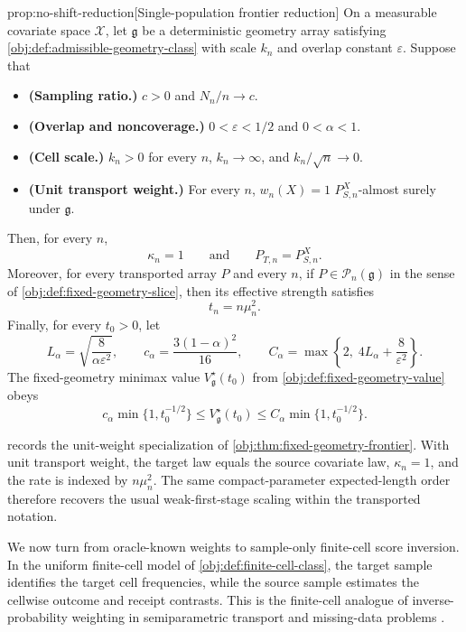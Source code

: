\begin{theoremv}{prop:no-shift-reduction}[Single-population frontier reduction]
On a measurable covariate space \(\mathcal X\), let \(\mathfrak g\) be a deterministic geometry array satisfying \cref{obj:def:admissible-geometry-class} with scale \(k_n\) and overlap constant \(\varepsilon\). Suppose that
\begin{itemize}
\item \textbf{(Sampling ratio.)} \(c>0\) and \(N_n/n \to c\).
\item \textbf{(Overlap and noncoverage.)} \(0<\varepsilon<1/2\) and \(0<\alpha<1\).
\item \textbf{(Cell scale.)} \(k_n>0\) for every \(n\), \(k_n\to\infty\), and \(k_n/\sqrt n\to 0\).
\item \textbf{(Unit transport weight.)} For every \(n\), \(w_n(X)=1\) \(P_{S,n}^X\)-almost surely under \(\mathfrak g\).
\end{itemize}
Then, for every \(n\),
\[
\kappa_n=1
\qquad\text{and}\qquad
P_{T,n}=P_{S,n}^X .
\]
Moreover, for every transported array \(P\) and every \(n\), if \(P\in\mathcal P_n(\mathfrak g)\) in the sense of \cref{obj:def:fixed-geometry-slice}, then its effective strength satisfies
\[
t_n
=
n\mu_n^2 .
\]
Finally, for every \(t_0>0\), let
\[
L_\alpha=\sqrt{\frac{8}{\alpha\varepsilon^2}},
\qquad
c_\alpha=\frac{3(1-\alpha)^2}{16},
\qquad
C_\alpha=\max\left\{2,\;4L_\alpha+\frac{8}{\varepsilon^2}\right\}.
\]
The fixed-geometry minimax value \(V_{\mathfrak g}^\star(t_0)\) from \cref{obj:def:fixed-geometry-value} obeys
\[
c_\alpha \min\{1,t_0^{-1/2}\}
\le
V_{\mathfrak g}^\star(t_0)
\le
C_\alpha \min\{1,t_0^{-1/2}\}.
\]
\end{theoremv}

 records the unit-weight specialization of \cref{obj:thm:fixed-geometry-frontier}.  With unit transport weight, the target law equals the source covariate law, \(\kappa_n=1\), and the rate is indexed by \(n\mu_n^2\).  The same compact-parameter expected-length order therefore recovers the usual weak-first-stage scaling within the transported notation.

We now turn from oracle-known weights to sample-only finite-cell score inversion. In the uniform finite-cell model of \cref{obj:def:finite-cell-class}, the target sample identifies the target cell frequencies, while the source sample estimates the cellwise outcome and receipt contrasts. This is the finite-cell analogue of inverse-probability weighting in semiparametric transport and missing-data problems \citep{HiranoImbensRidder2003,RobinsRotnitzkyZhao1994,VanDerLaanRubin2006,Chernozhukov2018}.

